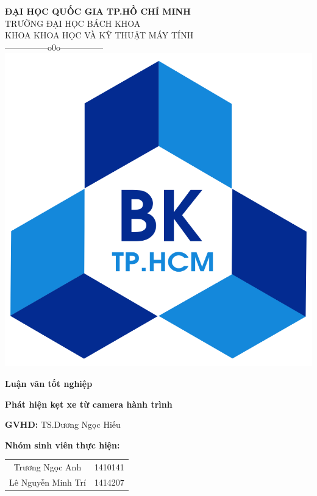 \documentclass[12pt]{report}
\begin{document}
\begin{titlepage}

\begin{center}
	\textbf{ĐẠI HỌC QUỐC GIA TP.HỒ CHÍ MINH}\\
	TRƯỜNG ĐẠI HỌC BÁCH KHOA\\
	KHOA KHOA HỌC VÀ KỸ THUẬT MÁY TÍNH\\
	---------------o0o--------------- \\
	\vspace{5mm}
	\includegraphics[scale=0.2]{charts/logo.png}
\end{center}
\vspace{5mm}

\begin{center}
	\textbf{Luận văn tốt nghiệp}
\end{center}

\textbf{\Large Phát hiện kẹt xe từ camera hành trình}

\vspace{5mm}

\textbf{GVHD: } TS.Dương Ngọc Hiếu

\vspace{5mm}

\textbf{Nhóm sinh viên thực hiện:}\par
\begin{tabular}{ c c }
 Trương Ngọc Anh & 1410141 \\ 
 Lê Nguyễn Minh Trí & 1414207     
\end{tabular}

\thispagestyle{empty}
\end{titlepage}
\end{document}

